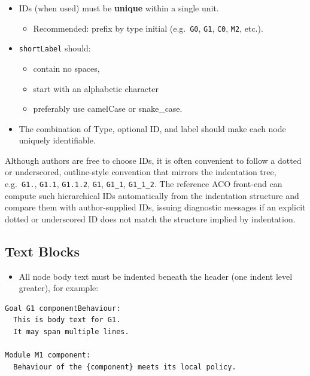 \documentclass[11pt,twoside,a4paper]{article}
\begin{document}
\begin{itemize}[leftmargin=2em]
  \item IDs (when used) must be \textbf{unique} within a single unit.
  \begin{itemize}[leftmargin=1.5em]
    \item Recommended: prefix by type initial (e.g.\ \texttt{G0}, \texttt{G1}, \texttt{C0}, \texttt{M2}, etc.).
  \end{itemize}

  \item \texttt{shortLabel} should:
  \begin{itemize}[leftmargin=1.5em]
    \item contain no spaces,
    \item start with an alphabetic character
    \item preferably use camelCase or snake\_case.
  \end{itemize}

  \item The combination of Type, optional ID, and label should make each node uniquely identifiable.
\end{itemize}

Although authors are free to choose IDs, it is often convenient to follow a dotted or underscored, outline-style convention that mirrors the indentation tree, e.g.\ \texttt{G1.}, \texttt{G1.1}, \texttt{G1.1.2},
\texttt{G1}, \texttt{G1\_1}, \texttt{G1\_1\_2}. The reference ACO front-end can compute such hierarchical IDs automatically from the indentation structure and compare them with author-supplied IDs, issuing diagnostic messages if an explicit dotted or underscored ID does not match the structure implied by indentation.

\subsection{Text Blocks}

\begin{itemize}[leftmargin=2em]
  \item All node body text must be indented beneath the header (one indent level greater), for example:
\end{itemize}

\begin{verbatim}
Goal G1 componentBehaviour:
  This is body text for G1.
  It may span multiple lines.

Module M1 component:
  Behaviour of the {component} meets its local policy.
\end{verbatim}
\end{document}
